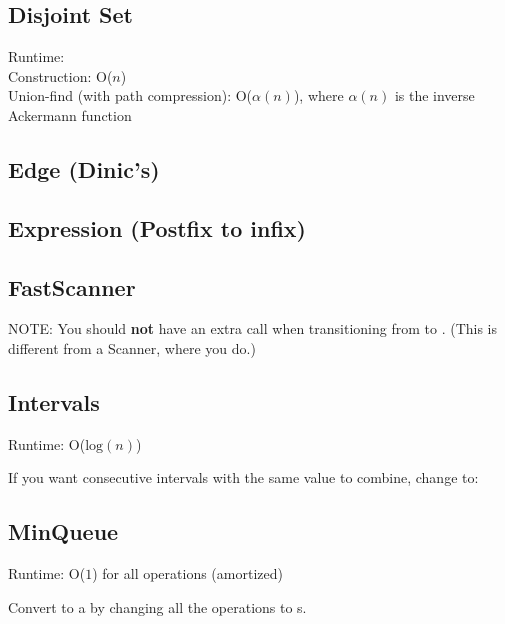 \subsection*{Disjoint Set} 

Runtime: \\
\indent Construction: O($n$) \\
\indent Union-find (with path compression): O($\alpha (n)$), where $\alpha (n)$ is the inverse Ackermann function



\subsection*{Edge (Dinic's)}



\subsection*{Expression (Postfix to infix)}



\subsection*{FastScanner}

NOTE: You should \textbf{not} have an extra  call when transitioning from  to . (This is different from a Scanner, where you do.)



\subsection*{Intervals}

Runtime: O($\text{log}(n)$)



If you want consecutive intervals with the same value to combine, change  to:



\subsection*{MinQueue}

Runtime: O($1$) for all operations (amortized)

Convert to a  by changing all the  operations to s.




\newpage